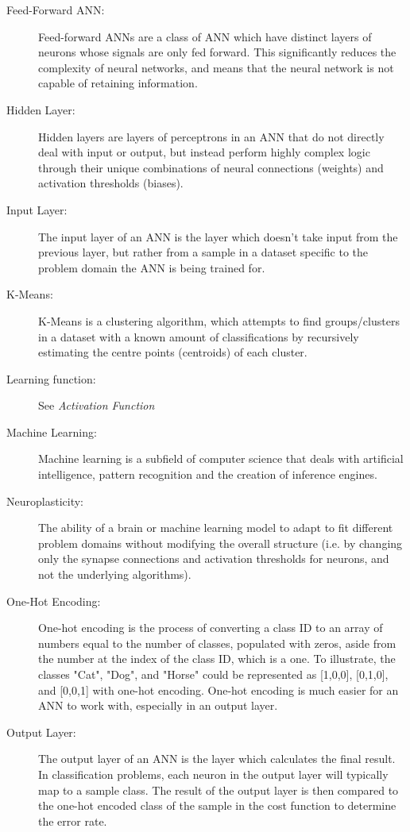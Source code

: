 \documentclass[]{report}
\begin{document}
\begin{description}
\item[Feed-Forward ANN:] Feed-forward ANNs are a class of ANN which have distinct layers of neurons whose signals are only fed forward. This significantly reduces the complexity of neural networks, and means that the neural network is not capable of retaining information.

\item[Hidden Layer:] Hidden layers are layers of perceptrons in an ANN that do not directly deal with input or output, but instead perform highly complex logic through their unique combinations of neural connections (weights) and activation thresholds (biases).

\item[Input Layer:] The input layer of an ANN is the layer which doesn't take input from the previous layer, but rather from a sample in a dataset specific to the problem domain the ANN is being trained for.

\item[K-Means:] K-Means is a clustering algorithm, which attempts to find groups/clusters in a dataset with a known amount of classifications by recursively estimating the centre points (centroids) of each cluster.

\item[Learning function:] See \textit{Activation Function}

\item[Machine Learning:] Machine learning is a subfield of computer science that deals with artificial intelligence, pattern recognition and the creation of inference engines.

\item[Neuroplasticity:] The ability of a brain or machine learning model to adapt to fit different problem domains without modifying the overall structure (i.e. by changing only the synapse connections and activation thresholds for neurons, and not the underlying algorithms).

\item[One-Hot Encoding:] One-hot encoding is the process of converting a class ID to an array of numbers equal to the number of classes, populated with zeros, aside from the number at the index of the class ID, which is a one. To illustrate, the classes "Cat", "Dog", and "Horse" could be represented as [1,0,0], [0,1,0], and [0,0,1] with one-hot encoding. One-hot encoding is much easier for an ANN to work with, especially in an output layer.

\item[Output Layer:] The output layer of an ANN is the layer which calculates the final result. In classification problems, each neuron in the output layer will typically map to a sample class. The result of the output layer is then compared to the one-hot encoded class of the sample in the cost function to determine the error rate.


\end{description}
\end{document}
